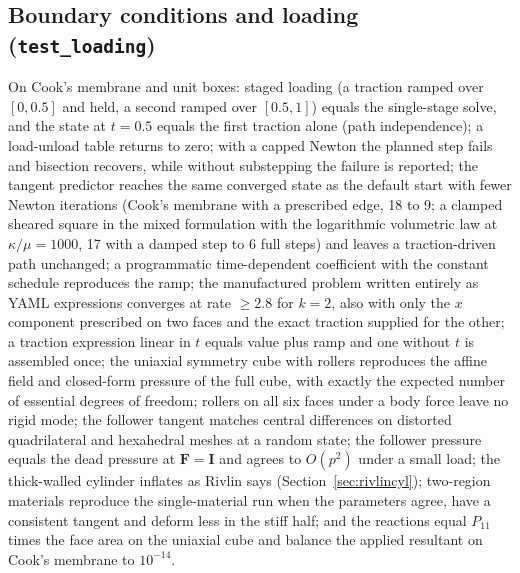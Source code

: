 \documentclass[11pt]{article}
\newcommand{\bF}{\bm{F}}
\newcommand{\bI}{\bm{I}}
\begin{document}
\subsection{Boundary conditions and loading (\texttt{test\_loading})}
On Cook's membrane and unit boxes: staged loading (a traction ramped over
$[0, 0.5]$ and held, a second ramped over $[0.5, 1]$) equals the
single-stage solve, and the state at $t = 0.5$ equals the first traction
alone (path independence); a load-unload table returns to zero; with a
capped Newton the planned step fails and bisection recovers, while without
substepping the failure is reported; the tangent predictor reaches the
same converged state as the default start with fewer Newton iterations
(Cook's membrane with a prescribed edge, 18 to 9; a clamped sheared square
in the mixed formulation with the logarithmic volumetric law at
$\kappa/\mu = 1000$, 17 with a damped step to 6 full steps) and leaves a
traction-driven path unchanged; a programmatic time-dependent
coefficient with the constant schedule reproduces the ramp; the
manufactured problem written entirely as YAML expressions converges at
rate $\ge 2.8$ for $k = 2$, also with only the $x$ component prescribed on
two faces and the exact traction supplied for the other; a traction
expression linear in $t$ equals value plus ramp and one without $t$ is
assembled once; the uniaxial symmetry cube with rollers reproduces the
affine field and closed-form pressure of the full cube, with exactly the
expected number of essential degrees of freedom; rollers on all six faces
under a body force leave no rigid mode; the follower tangent matches
central differences on distorted quadrilateral and hexahedral meshes at a
random state; the follower pressure equals the dead pressure at $\bF = \bI$
and agrees to $O(p^2)$ under a small load; the thick-walled cylinder
inflates as Rivlin says (Section~\ref{sec:rivlincyl}); two-region
materials reproduce the single-material run when the parameters agree, have
a consistent tangent and deform less in the stiff half; and the reactions
equal $P_{11}$ times the face area on the uniaxial cube and balance the
applied resultant on Cook's membrane to $10^{-14}$.
\end{document}

